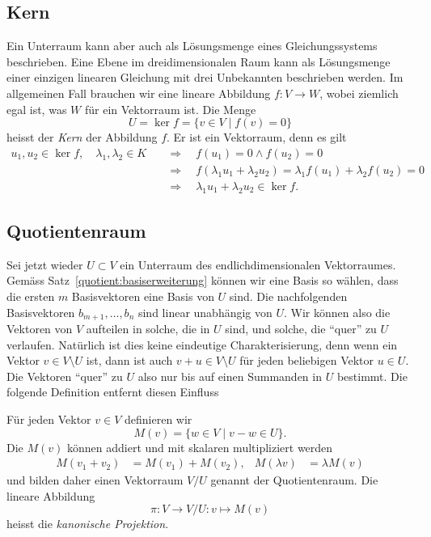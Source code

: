 \subsection{Kern}
Ein Unterraum kann aber auch als Lösungsmenge eines Gleichungssystems
beschrieben.
Eine Ebene im dreidimensionalen Raum kann als Lösungsmenge einer einzigen
linearen Gleichung mit drei Unbekannten beschrieben werden.
Im allgemeinen Fall brauchen wir eine lineare Abbildung $f\colon V\to W$,
wobei ziemlich egal ist, was $W$ für ein Vektorraum ist.
Die Menge
\[
U=\operatorname{ker}f = \{ v\in V\;|\; f(v)=0\}
\]
heisst der {\em Kern} der Abbildung $f$.
Er ist ein Vektorraum, denn es gilt
\begin{align*}
u_1,u_2\in\operatorname{ker} f,\quad \lambda_1,\lambda_2\in K
\quad
&\Rightarrow
\quad
f(u_1)=0\wedge f(u_2)=0
\\
&\Rightarrow
\quad
f(\lambda_1u_1+\lambda_2u_2)
=
\lambda_1 f(u_1) + \lambda_2 f(u_2)
=
0
\\
&\Rightarrow
\quad
\lambda_1 u_1 + \lambda_2 u_2\in \operatorname{ker}f.
\end{align*}

\subsection{Quotientenraum}
Sei jetzt wieder $U\subset V$ ein Unterraum des endlichdimensionalen
Vektorraumes.
Gemäss Satz~\ref{quotient:basiserweiterung} können wir eine Basis so
wählen, dass die ersten $m$ Basisvektoren eine Basis von $U$ sind.
Die nachfolgenden Basisvektoren $b_{m+1},\dots,b_n$ sind linear unabhängig
von $U$.
Wir können also die Vektoren von $V$ aufteilen in solche, die in $U$
sind, und solche, die ``quer'' zu $U$ verlaufen.
Natürlich ist dies keine eindeutige Charakterisierung, denn wenn ein
Vektor $v\in V\setminus U$ ist, dann ist auch $v+u\in V\setminus U$
für jeden beliebigen Vektor $u\in U$.
Die Vektoren ``quer'' zu $U$ also nur bis auf einen Summanden in $U$
bestimmt.
Die folgende Definition entfernt diesen Einfluss

\begin{definition}
Für jeden Vektor $v\in V$ definieren wir 
\[
M(v) = \{ w\in V\;|\; v-w\in U\}.
\]
Die $M(v)$ können addiert und mit skalaren multipliziert werden
\[
\begin{aligned}
M(v_1+v_2)&=M(v_1) + M(v_2),&
M(\lambda v)&=\lambda M(v)
\end{aligned}
\]
und bilden daher einen Vektorraum $V/U$ genannt der Quotientenraum.
Die lineare Abbildung
\[
\pi \colon V \to V/U : v \mapsto M(v)
\]
heisst die {\em kanonische Projektion}.
\end{definition}

